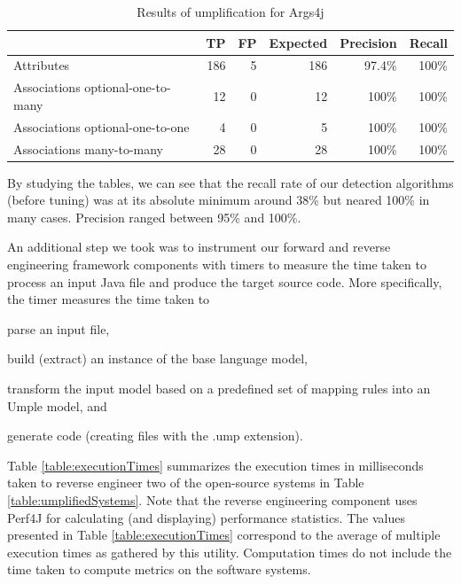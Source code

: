 \begin{table}[h]
\caption{Results of umplification for Args4j}
\label{table:umplifiedResultsSystems7}
\centering 
\begin{tabular}{p{4cm}|rrrrr}
\toprule
\rowcolor[HTML]{BBDAFF}
\textbf{} & \textbf{TP}  & \textbf{FP} & \textbf{Expected}  & \textbf{Precision}  & \textbf{Recall}\\ \hline
Attributes & 186 & 5 & 186 & 97.4\% & 100\%  \\ \hline
Associations optional-one-to-many &  12 & 0 & 12 & 100\% & 100\%\\ \hline
Associations optional-one-to-one &  4 & 0 & 5  & 100\% & 100\% \\ \hline
Associations many-to-many & 28 & 0 & 28 & 100\% & 100\% \\ \bottomrule
\end{tabular}
\end{table}

By studying the tables, we can see that the recall rate of our detection algorithms (before tuning) was at its absolute minimum around 38\% but neared 100\% in many cases. Precision ranged between 95\% and 100\%.

An additional step we took was to instrument our forward and reverse engineering framework components with timers to measure the time taken to process an input Java file and produce the target source code. More specifically, the timer measures the time taken to 
\begin{enumerate*}
\item parse an input file,  \item build (extract) an instance of the base language model,   \item  transform the input model based on a predefined set of mapping rules into an Umple model, and \item generate code  (creating files with the .ump extension).
\end{enumerate*}

Table \ref{table:executionTimes} summarizes the execution times in milliseconds taken to reverse engineer two of the open-source systems in Table \ref{table:umplifiedSystems}. Note that the reverse engineering component uses Perf4J \cite{Perf4j} for calculating (and displaying) performance statistics. The values presented in Table \ref{table:executionTimes} correspond to the average of multiple execution times as gathered by this utility. Computation times do not include the time taken to compute metrics on the software systems. 

